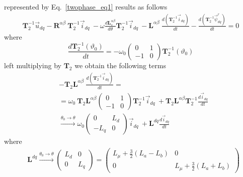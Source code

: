 \documentclass[12pt,a4paper,oneside]{book}
\begin{document}
\begin{onehalfspace}
represented by Eq.~\eqref{twophase_eq1} results as follows
\begin{equation*}
	\begin{aligned}
		\mathbf{T}_2^{-1}\vec{u}_{dq}-\mathbf{R}^{\alpha\beta}\ 
		\mathbf{T}_2^{-1}\vec{i}_{dq}\ 
		-\omega\frac{d\mathbf{L}_s^{\alpha\beta}}{d\theta}\mathbf{T}_2^{-1}\vec{i}_{dq}\
		-\mathbf{L}^{\alpha\beta}\ \frac{d\left( 
			\mathbf{T}_2^{-1}\vec{i}_{dq}\right) }{dt}-\frac{d\left( 
			\mathbf{T}_2^{-1}\vec{\psi}_{dq}^r\right) }{dt} = 0
	\end{aligned} 
\end{equation*}
where
\begin{equation}
	\frac{d\mathbf{T}_2^{-1}(\vartheta_0)}{dt}= -\omega_0\begin{pmatrix} 0 & 
		1\\ -1 & 0 \end{pmatrix}\mathbf{T}_2^{-1}(\vartheta_0)
\end{equation}
left multiplying by $\mathbf{T}_2$ we obtain the following terms
\begin{equation}
	\begin{aligned}
		&-\mathbf{T}_2\mathbf{L}^{\alpha\beta}\ \frac{d\left( 
			\mathbf{T}_2^{-1}\vec{i}_{dq}\right) }{dt} = \\[6pt]
		&=\omega_0\ \mathbf{T}_2\mathbf{L}^{\alpha\beta}\begin{pmatrix} 0 & 1\\ 
			-1 & 0 \end{pmatrix}\mathbf{T}_2^{-1}\vec{i}_{dq}\ + 
		\mathbf{T}_2\mathbf{L}^{\alpha\beta}\mathbf{T}_2^{-1}\frac{d\vec{i}_{dq}}{dt}
		\\[6pt]
		&\xrightarrow{\theta_0\rightarrow\theta} \omega_0\begin{pmatrix} 0 & 
			L_d\\ -L_q & 0 \end{pmatrix}\vec{i}_{dq}\ + 
		\mathbf{L}^{dq}\frac{d\vec{i}_{dq}}{dt}
	\end{aligned}
\end{equation}
where 
\begin{equation}
	\begin{aligned}
		&\mathbf{L}^{dq} \xrightarrow{\theta_0\rightarrow\theta} 
		\begin{pmatrix} L_d & 0\\ 0 & L_q \end{pmatrix} = \begin{pmatrix} 
			L_{\mu}+\frac{3}{2}(L_a-L_b) & 0\\ 0 & L_{\mu}+\frac{3}{2}(L_a+L_b) 

\end{pmatrix}
\end{aligned}
\end{equation}
\end{onehalfspace}
\end{document}
